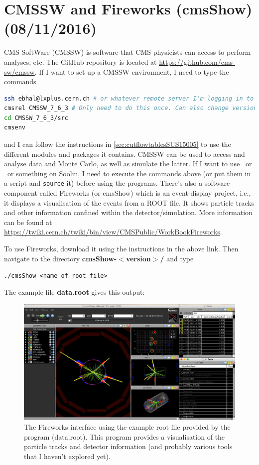 \newpage
\section{CMSSW and Fireworks (cmsShow) (08/11/2016)}
\label{sec:fireworks}

CMS SoftWare (CMSSW) is software that CMS physicists can access to perform analyses, etc. The GitHub repository is located at \url{https://github.com/cms-sw/cmssw}. If I want to set up a CMSSW environment, I need to type the commands

\begin{lstlisting}[belowskip=-0.7cm, language=sh, numbers=none]
ssh ebhal@lxplus.cern.ch # or whatever remote server I'm logging in to
cmsrel CMSSW_7_6_3 # Only need to do this once. Can also change version I'm working with
cd CMSSW_7_6_3/src
cmsenv
\end{lstlisting}

and I can follow the instructions in \ref{sec:cutflowtablesSUS15005} to use the different modules and packages it contains. CMSSW can be used to access and analyse data and Monte Carlo, as well as simulate the latter. If I want to use \madgraph\ or \madanalysis\ or something on Soolin, I need to execute the commands above (or put them in a script and \verb!source! it) before using the programs. There's also a software component called Fireworks (or cmsShow) which is an event-display project, i.e., it displays a visualisation of the events from a ROOT file. It shows particle tracks and other information confined within the detector/simulation. More information can be found at \url{https://twiki.cern.ch/twiki/bin/view/CMSPublic/WorkBookFireworks}.

To use Fireworks, download it using the instructions in the above link. Then navigate to the directory \textbf{cmsShow-$<$version$>$/} and type

\verb!./cmsShow <name of root file>!

The example file \textbf{data.root} gives this output:

\begin{figure}[H]
\centering
\includegraphics[width=\textwidth]{./sec12/fireworksexample.png}
\caption{The Fireworks interface using the example root file provided by the program (data.root). This program provides a visualisation of the particle tracks and detector information (and probably various tools that I haven't explored yet).}
\end{figure}

